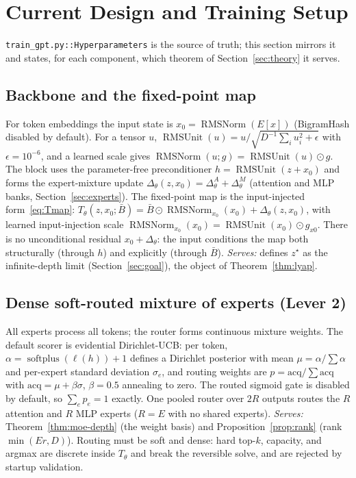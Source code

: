 \documentclass[11pt]{article}
\newcommand{\RMSUnit}{\operatorname{RMSUnit}}
\newcommand{\RMSNorm}{\operatorname{RMSNorm}}
\begin{document}
\section{Current Design and Training Setup}
\label{sec:design}

\texttt{train\_gpt.py::Hyperparameters} is the source of truth; this section mirrors it and
states, for each component, which theorem of Section~\ref{sec:theory} it serves.

\subsection{Backbone and the fixed-point map}
\label{sec:backbone}

For token embeddings the input state is $x_0=\RMSNorm(E[x])$ (BigramHash disabled by default).
For a tensor $u$, $\RMSUnit(u)=u/\sqrt{D^{-1}\sum_i u_i^2+\epsilon}$ with $\epsilon=10^{-6}$, and a
learned scale gives $\RMSNorm(u;g)=\RMSUnit(u)\odot g$.  The block uses the parameter-free
preconditioner $h=\RMSUnit(z+x_0)$ and forms the expert-mixture update
$\Delta_\theta(z,x_0)=\Delta^A_\theta+\Delta^M_\theta$ (attention and MLP banks,
Section~\ref{sec:experts}).  The fixed-point map is the input-injected
form~\eqref{eq:Tmap}: $T_\theta(z,x_0;\bar B)=\bar B\odot\RMSNorm_{x_0}(x_0)+\Delta_\theta(z,x_0)$,
with learned input-injection scale $\RMSNorm_{x_0}(x_0)=\RMSUnit(x_0)\odot g_{x0}$.  There is no
unconditional residual $x_0+\Delta_\theta$: the input conditions the map both structurally
(through $h$) and explicitly (through $\bar B$).  \emph{Serves:} defines $z^\star$ as the
infinite-depth limit (Section~\ref{sec:goal}), the object of Theorem~\ref{thm:lyap}.

\subsection{Dense soft-routed mixture of experts (Lever 2)}
\label{sec:router}

All experts process all tokens; the router forms continuous mixture weights.  The default
scorer is evidential Dirichlet-UCB: per token, $\alpha=\operatorname{softplus}(\ell(h))+1$ defines
a Dirichlet posterior with mean $\mu=\alpha/\!\sum\alpha$ and per-expert standard deviation
$\sigma_e$, and routing weights are $p=\mathrm{acq}/\!\sum\mathrm{acq}$ with
$\mathrm{acq}=\mu+\beta\sigma$, $\beta=0.5$ annealing to zero.  The routed sigmoid gate is
disabled by default, so $\sum_e p_e=1$ exactly.  One pooled router over $2R$ outputs routes the
$R$ attention and $R$ MLP experts ($R=E$ with no shared experts).  \emph{Serves:}
Theorem~\ref{thm:moe-depth} (the weight basis) and Proposition~\ref{prop:rank} (rank $\min(Er,D)$).
Routing must be soft and dense: hard top-$k$, capacity, and argmax are discrete inside
$T_\theta$ and break the reversible solve, and are rejected by startup validation.
\end{document}
